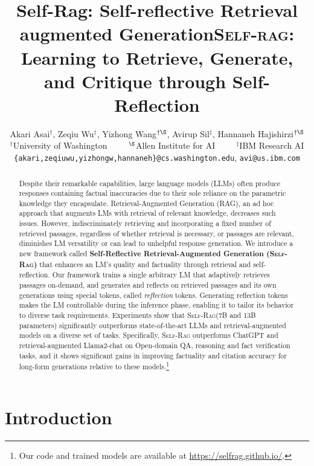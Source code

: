 \documentclass{article} %
\title{Self-Rag: Self-reflective Retrieval augmented Generation}
\title{\textsc{Self-rag:} Learning to Retrieve, Generate, and Critique through Self-Reflection}
\author{Akari Asai$^\dagger$, Zeqiu Wu$^\dagger$, Yizhong Wang$^{\dagger\S}$, Avirup Sil$^\ddagger$, Hannaneh Hajishirzi$^{\dagger\S}$ \\
$^\dagger$University of Washington~~~~~$^\S$Allen Institute for AI~~~~~$^\ddagger$IBM Research AI \\
\texttt{\{akari,zeqiuwu,yizhongw,hannaneh\}@cs.washington.edu}, \texttt{avi@us.ibm.com} \\
}
\newcommand{\model}{\textsc{Self-Rag}\xspace}
\begin{document}
\maketitle

\begin{abstract}
Despite their remarkable capabilities, large language models (LLMs) often produce responses containing factual inaccuracies due to their sole reliance on the parametric knowledge they encapsulate. 
Retrieval-Augmented Generation (RAG), an ad hoc approach that augments LMs with retrieval of relevant knowledge, decreases such issues. 
However, indiscriminately retrieving and incorporating a fixed number of retrieved passages, regardless of whether retrieval is necessary, or passages are relevant, diminishes LM versatility or can lead to unhelpful response generation.
We introduce a new framework called {\bf Self-Reflective Retrieval-Augmented Generation (\model)} that enhances an LM's quality and factuality through retrieval and self-reflection. 
Our framework trains a single arbitrary LM that adaptively retrieves passages on-demand, and generates and reflects on retrieved passages and its own generations using special tokens, called {\it reflection} tokens. Generating reflection tokens makes the LM controllable during the inference phase, enabling it to tailor its behavior to diverse task requirements. 
Experiments show that \model (7B and 13B parameters) significantly outperforms state-of-the-art LLMs and retrieval-augmented models on a diverse set of tasks. 
Specifically, \model outperforms ChatGPT and retrieval-augmented Llama2-chat on Open-domain QA, reasoning and fact verification tasks, and it shows significant gains in improving factuality and citation accuracy for long-form generations relative to these models.\footnote{{Our code and trained models are available at \url{https://selfrag.github.io/}}.}  


\end{abstract}

\section{Introduction}
\end{document}
